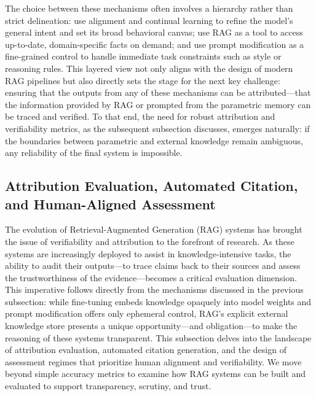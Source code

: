 \documentclass[11pt]{article}
\begin{document}
The choice between these mechanisms often involves a hierarchy rather than strict delineation: use alignment and continual learning to refine the model's general intent and set its broad behavioral canvas; use RAG as a tool to access up-to-date, domain-specific facts on demand; and use prompt modification as a fine-grained control to handle immediate task constraints such as style or reasoning rules. This layered view not only aligns with the design of modern RAG pipelines but also directly sets the stage for the next key challenge: ensuring that the outputs from any of these mechanisms can be attributed---that the information provided by RAG or prompted from the parametric memory can be traced and verified. To that end, the need for robust attribution and verifiability metrics, as the subsequent subsection discusses, emerges naturally: if the boundaries between parametric and external knowledge remain ambiguous, any reliability of the final system is impossible.

\subsection{Attribution Evaluation, Automated Citation, and Human-Aligned Assessment}

The evolution of Retrieval-Augmented Generation (RAG) systems has brought the issue of verifiability and attribution to the forefront of research. As these systems are increasingly deployed to assist in knowledge-intensive tasks, the ability to audit their outputs---to trace claims back to their sources and assess the trustworthiness of the evidence---becomes a critical evaluation dimension. This imperative follows directly from the mechanisms discussed in the previous subsection: while fine-tuning embeds knowledge opaquely into model weights and prompt modification offers only ephemeral control, RAG's explicit external knowledge store presents a unique opportunity---and obligation---to make the reasoning of these systems transparent. This subsection delves into the landscape of attribution evaluation, automated citation generation, and the design of assessment regimes that prioritize human alignment and verifiability. We move beyond simple accuracy metrics to examine how RAG systems can be built and evaluated to support transparency, scrutiny, and trust.
\end{document}
